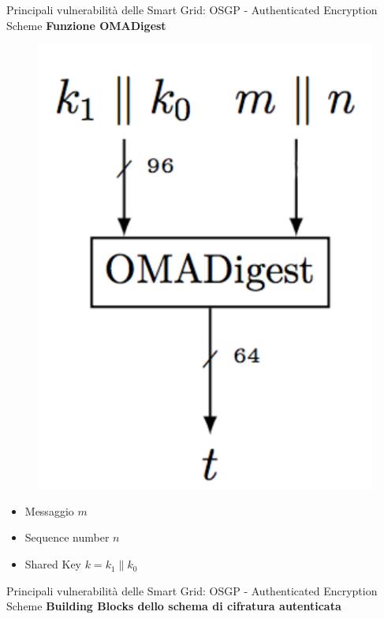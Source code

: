 \begin{frame}{Principali vulnerabilità delle Smart Grid: OSGP - Authenticated Encryption Scheme}
	\textbf{Funzione OMADigest}
	\begin{figure}[h] 
		\includegraphics[scale=0.4,cfbox=blue_slides 1pt 0pt]{imgs/OMADigest.png}
	\end{figure}
	\begin{itemize}
		\item Messaggio $m$
		\item Sequence number $n$
		\item Shared Key $k = k_1 \| k_0$
	\end{itemize}
\end{frame}

\begin{frame}{Principali vulnerabilità delle Smart Grid: OSGP - Authenticated Encryption Scheme}
	\textbf{Building Blocks dello schema di cifratura autenticata}
\end{frame}

